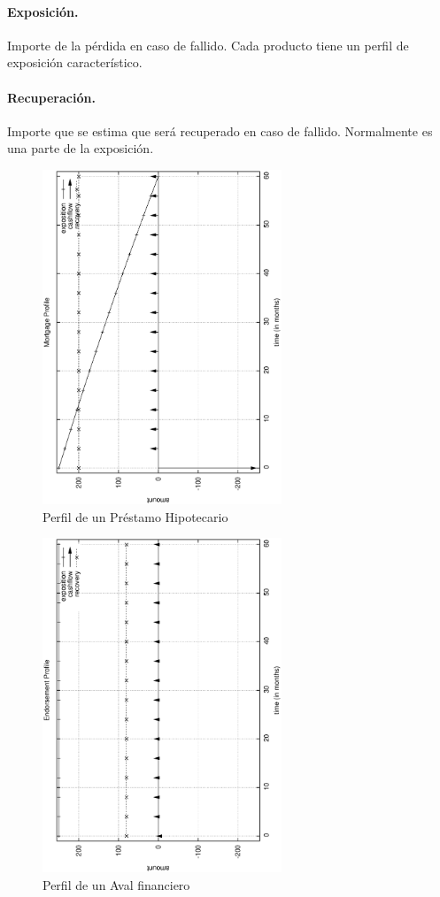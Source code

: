 \paragraph{Exposici\'on.} Importe de la p\'erdida en caso de fallido. Cada 
producto tiene un perfil de exposici\'on caracter\'istico.

\paragraph{Recuperaci\'on.} Importe que se estima que ser\'a recuperado en 
caso de fallido. Normalmente es una parte de la exposici\'on.


\begin{figure}[!hb]
\begin{center}
\includegraphics[height=10cm, angle=-90]{./images/mortgage.ps}
\caption{Perfil de un Pr\'estamo Hipotecario}
\label{mortgage}
\end{center}
\end{figure}


\begin{figure}[!hb]
\begin{center}
\includegraphics[height=10cm, angle=-90]{./images/endorsement.ps}
\caption{Perfil de un Aval financiero}
\label{endorsement}
\end{center}
\end{figure}

